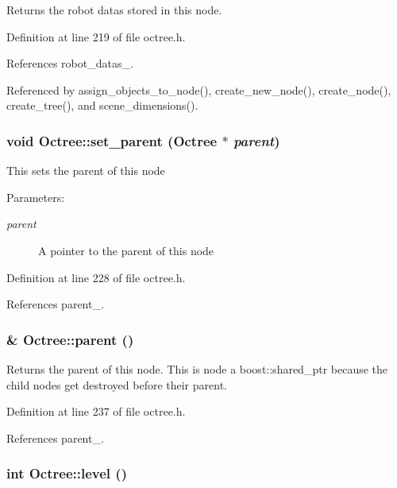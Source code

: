 Returns the robot datas stored in this node. 

Definition at line 219 of file octree.h.

References robot\_\-datas\_\-.

Referenced by assign\_\-objects\_\-to\_\-node(), create\_\-new\_\-node(), create\_\-node(), create\_\-tree(), and scene\_\-dimensions().\hypertarget{class_octree_9b884a39d8adf578ced6df783d477c4c}{
\subsubsection[set\_\-parent]{\setlength{\rightskip}{0pt plus 5cm}void Octree::set\_\-parent ({\bf Octree} $\ast$ {\em parent})}}
\label{class_octree_9b884a39d8adf578ced6df783d477c4c}


This sets the parent of this node

\begin{Desc}
\item[Parameters:]
\begin{description}
\item[{\em parent}]A pointer to the parent of this node \end{description}
\end{Desc}


Definition at line 228 of file octree.h.

References parent\_\-.\hypertarget{class_octree_1aa93bae9b39e49b97f587357747cd17}{
\subsubsection[parent]{\& Octree::parent ()}}
\label{class_octree_1aa93bae9b39e49b97f587357747cd17}


Returns the parent of this node. This is node a boost::shared\_\-ptr because the child nodes get destroyed before their parent. 

Definition at line 237 of file octree.h.

References parent\_\-.\hypertarget{class_octree_e6729a08500e8937d91d809db870777c}{
\subsubsection[level]{\setlength{\rightskip}{0pt plus 5cm}int Octree::level ()}}
\label{class_octree_e6729a08500e8937d91d809db870777c}


